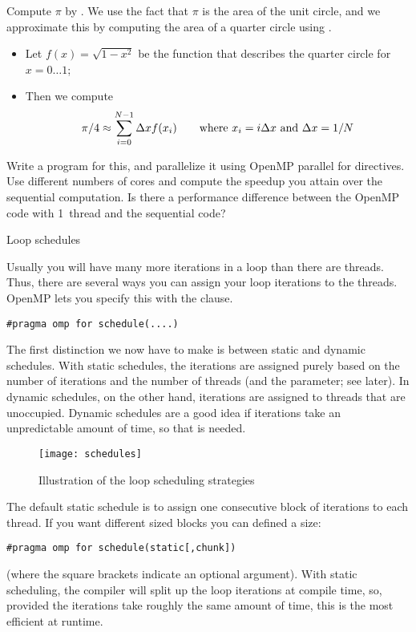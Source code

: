\begin{exercise}
  \label{ex:omp-pi}
  Compute $\pi$ by . We use the fact that $\pi$
  is the area of the unit circle, and we approximate this by computing
  the area of a quarter circle using .
  \begin{itemize}
  \item Let $f(x)=\sqrt{1-x^2}$ be the function that describes the
    quarter circle for $x=0\ldots 1$;
  \item Then we compute \[ \pi/4\approx\sum_{i=0}^{N-1} \Delta x
    f(x_i) \qquad \hbox{where $x_i=i\Delta x$ and $\Delta x=1/N$} \]
  \end{itemize}
  Write a program for this, and parallelize it using OpenMP parallel
  for directives. Use different numbers of cores and compute the
  speedup you attain over the sequential computation. Is there a
  performance difference between the OpenMP code with 1~thread and the
  sequential code?
\end{exercise}

 {Loop schedules}

Usually you will have many more iterations in a loop than there are threads.
Thus, there are several ways you can assign your loop iterations to the threads.
OpenMP lets you specify this with the  clause.
\begin{verbatim}
#pragma omp for schedule(....)
\end{verbatim}

The first distinction we now have to make is between static and dynamic schedules.
With static schedules, the iterations are assigned purely based on the number
of iterations and the number of threads (and the  parameter; see later).
In dynamic schedules, on the other hand, iterations are assigned to threads that
are unoccupied. Dynamic schedules are a good idea if iterations take an unpredictable
amount of time, so that  is needed.

\begin{figure}[ht]
  \texttt{[image: schedules]}
  \caption{Illustration of the loop scheduling strategies}
  \label{fig:omp-schedule}
\end{figure}

The default static schedule is to assign one consecutive block of iterations
to each thread. If you want different sized blocks you can defined a  size:
\begin{verbatim}
#pragma omp for schedule(static[,chunk])
\end{verbatim}
(where the square brackets indicate an optional argument).
With static scheduling, the compiler will split up the loop iterations at compile time,
so, provided the iterations take roughly the same amount of time, this is the most efficient at runtime.

